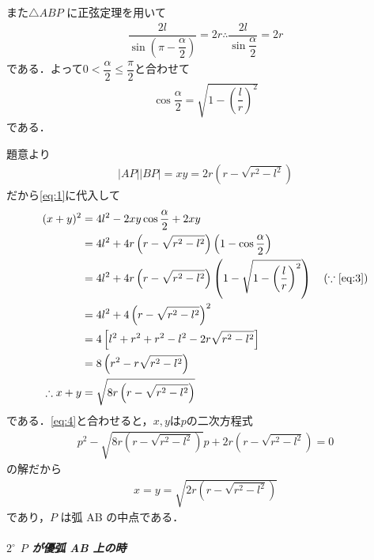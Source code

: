 \documentclass[../../main.tex]{subfiles}
\begin{document}
また$\triangle ABP$ に正弦定理を用いて
\begin{align}
  \dfrac{2l}{\sin\left(\pi - \dfrac{\alpha}{2}\right)} = 2r
  \therefore
  \dfrac{2l}{\sin\dfrac{\alpha}{2}} = 2r \label{eq:2}
\end{align}
である．よって$0<\dfrac{\alpha}{2} \le \dfrac{\pi}{2}$と合わせて
\begin{align}
  \cos \dfrac{\alpha}{2} = \sqrt{1 - \left(\dfrac{l}{r}\right)^2} \label{eq:3}
\end{align}
である．

題意より
\begin{align}
  |AP||BP| = xy = 2r\left(r - \sqrt{r^2 - l^2}\right) \label{eq:4}
\end{align}
だから\cref{eq:1}に代入して
\begin{align}
  (x+y)^2
  &= 4l^2 - 2xy \cos\dfrac{\alpha}{2} + 2xy \\
  &= 4l^2 + 4r\left(r - \sqrt{r^2 - l^2}\right)\left(1 - \cos\dfrac{\alpha}{2}\right) \\
  &= 4l^2 + 4r\left(r - \sqrt{r^2 - l^2}\right)\left(1 - \sqrt{1 - \left(\dfrac{l}{r}\right)^2}\right) \quad (\because\text{\cref{eq:3}}) \\
  &= 4l^2 + 4\left(r - \sqrt{r^2 - l^2}\right)^2 \\
  &= 4\left[ l^2 + r^2 + r^2 - l^2 - 2r\sqrt{r^2 - l^2} \right] \\
  &= 8\left(r^2 - r\sqrt{r^2 - l^2}\right) \\
  \therefore
  x+y & = \sqrt{8r\left(r - \sqrt{r^2 - l^2}\right)} \label{eq:5}
\end{align}
である．\cref{eq:4}と合わせると，$x,y$は$p$の二次方程式
\begin{align}
  p^2 - \sqrt{8r\left(r - \sqrt{r^2 - l^2}\right)} p + 2r\left(r - \sqrt{r^2 - l^2}\right) = 0
\end{align}
の解だから
\begin{align}
  x = y = \sqrt{2r(r-\sqrt{r^2 - l^2})}
\end{align}
であり，$P$ は弧 AB の中点である．

\subparagraph{$2^{\circ}$ $P$ が優弧 AB 上の時}
\end{document}
